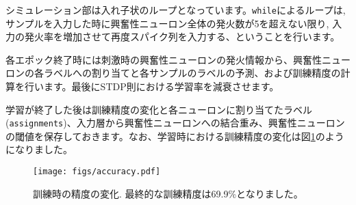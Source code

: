 シミュレーション部は入れ子状のループとなっています。\texttt{while}によるループは, サンプルを入力した時に興奮性ニューロン全体の発火数が5を超えない限り, 入力の発火率を増加させて再度スパイク列を入力する、ということを行います。\par
各エポック終了時には刺激時の興奮性ニューロンの発火情報から、興奮性ニューロンの各ラベルへの割り当てと各サンプルのラベルの予測、および訓練精度の計算を行います。最後にSTDP則における学習率を減衰させます。\par
学習が終了した後は訓練精度の変化と各ニューロンに割り当てたラベル(\texttt{assignments})、入力層から興奮性ニューロンへの結合重み、興奮性ニューロンの閾値を保存しておきます。なお、学習時における訓練精度の変化は図\ref{fig:MNISTaccuracy}のようになりました。
\begin{figure}[htbp]
    \centering
    \texttt{[image: figs/accuracy.pdf]}
    \caption{訓練時の精度の変化. 最終的な訓練精度は69.9\%となりました。}
    \label{fig:MNISTaccuracy}
\end{figure}

